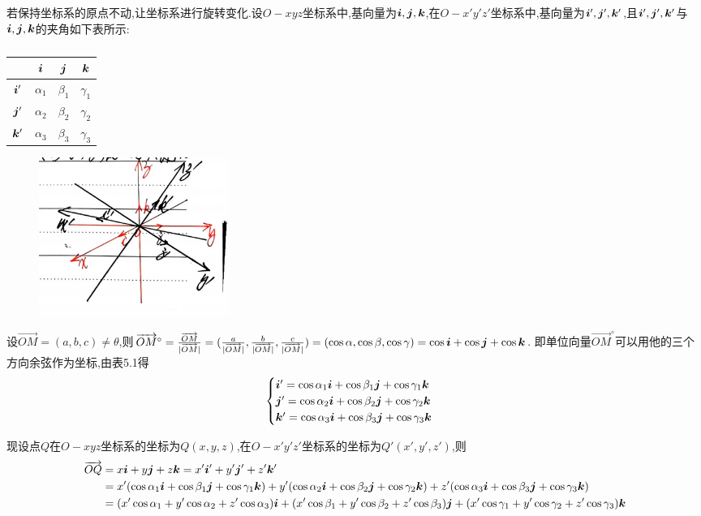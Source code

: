 \begin{solution}
    若保持坐标系的原点不动,让坐标系进行旋转变化.设$O-xyz$坐标系中,基向量为$\bm{i},\bm{j},\bm{k}$,在$O-x'y'z'$坐标系中,基向量为$\bm{i}',\bm{j}',\bm{k}'$,且$\bm{i}',\bm{j}',\bm{k}'$与$\bm{i},\bm{j},\bm{k}$的夹角如下表所示:
    \begin{table}[htbp]\label{ijk-i'j'k'}
        \centering
        \begin{tabular}{|c|c|c|c|}
            \hline
            & $\bm{i}$ & $\bm{j}$ & $\bm{k}$\\
            \hline
            $\bm{i}'$ & $\alpha_1$ & $\beta_1$ & $\gamma_1$\\
            \hline
            $\bm{j}'$ & $\alpha_2$ & $\beta_2$ & $\gamma_2$\\
            \hline
            $\bm{k}'$ & $\alpha_3$ & $\beta_3$ & $\gamma_3$\\
            \hline
        \end{tabular}
        \caption{}
    \end{table}

    \begin{figure}[htbp]
        \centering
        \includegraphics[width=0.3\textwidth]{figure/5-1.png}
        \caption{}
    \end{figure}

设$\overrightarrow{OM} = (a,b,c) \neq \theta$,则$\overrightarrow{OM}^\circ = \frac{\overrightarrow{OM}}{|\overrightarrow{OM}|} = (\frac{a}{|\overrightarrow{OM}|},\frac{b}{|\overrightarrow{OM}|},\frac{c}{|\overrightarrow{OM}|}) = (\cos \alpha, \cos \beta, \cos \gamma) = \cos \bm{i} + \cos \bm{j} + \cos \bm{k}$.
即单位向量$\overrightarrow{OM}^\circ$可以用他的三个方向余弦作为坐标,由表5.1得
$$
\begin{cases}
    \bm{i}' = \cos \alpha_1 \bm{i} + \cos \beta_1 \bm{j} + \cos \gamma_1 \bm{k}\\
    \bm{j}' = \cos \alpha_2 \bm{i} + \cos \beta_2 \bm{j} + \cos \gamma_2 \bm{k}\\
    \bm{k}' = \cos \alpha_3 \bm{i} + \cos \beta_3 \bm{j} + \cos \gamma_3 \bm{k}
\end{cases}
$$

现设点$Q$在$O-xyz$坐标系的坐标为$Q(x,y,z)$,在$O-x'y'z'$坐标系的坐标为$Q'(x',y',z')$,则
\begin{align*}
    \overrightarrow{OQ} &= x\bm{i} + y\bm{j} + z\bm{k} = x'\bm{i}' + y'\bm{j}' + z'\bm{k}'\\
    &= x'(\cos \alpha_1 \bm{i} + \cos \beta_1 \bm{j} + \cos \gamma_1 \bm{k}) + y'(\cos \alpha_2 \bm{i} + \cos \beta_2 \bm{j} + \cos \gamma_2 \bm{k}) + z'(\cos \alpha_3 \bm{i} + \cos \beta_3 \bm{j} + \cos \gamma_3 \bm{k})\\
    &= (x' \cos \alpha_1 + y' \cos \alpha_2 + z' \cos \alpha_3)\bm{i} + (x' \cos \beta_1 + y' \cos \beta_2 + z' \cos \beta_3)\bm{j} + (x' \cos \gamma_1 + y' \cos \gamma_2 + z' \cos \gamma_3)\bm{k}
\end{align*}


\end{solution}
